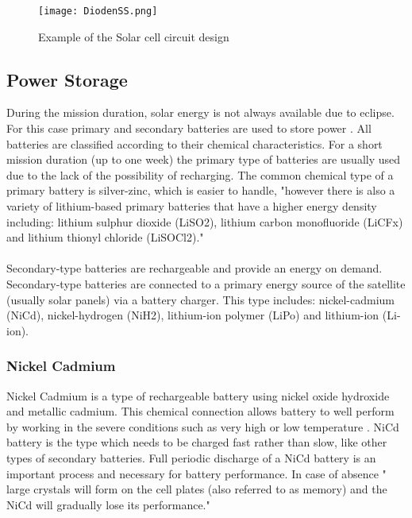 \begin{figure}[h]
	\centering
	\texttt{[image: DiodenSS.png]}
	\caption{ Example of the Solar cell circuit design}
	\label{dioden}
\end{figure}
 
\newpage


\subsection{Power Storage \label{sec:tech1}}



 During the mission duration, solar energy is not always available due to eclipse. For this case primary and secondary batteries are used to store power \cite{1}. All batteries are classified according to their chemical characteristics. For a short mission duration (up to one week)  the primary type of batteries are usually used due to the lack of the possibility of recharging. The common chemical type of a primary battery is silver-zinc, which is easier to handle, \cite{1} "however there is also a variety of lithium-based primary batteries that have a higher energy density including: lithium sulphur dioxide (LiSO2), lithium carbon monofluoride (LiCFx) and lithium thionyl chloride (LiSOCl2)."\\
\\
Secondary-type batteries are rechargeable and provide an energy on demand. Secondary-type batteries are connected to a primary energy source of the satellite (usually solar panels) via a battery charger. This type includes: nickel-cadmium (NiCd), nickel-hydrogen (NiH2), lithium-ion polymer (LiPo) and lithium-ion (Li-ion).

\subsubsection{Nickel Cadmium \label{sec:tech}}
  Nickel Cadmium is a type of rechargeable battery using nickel oxide hydroxide and metallic cadmium. This chemical connection allows battery to well perform by working in the severe conditions such as very high or low temperature \cite{7}. NiCd battery is the type which needs to be charged fast rather than slow, like other types of secondary batteries. Full periodic discharge of a NiCd battery is an important process and necessary for battery performance. In case of absence   \cite{7} " large crystals will form on the cell plates (also referred to as memory) and the NiCd will gradually lose its performance."
 
